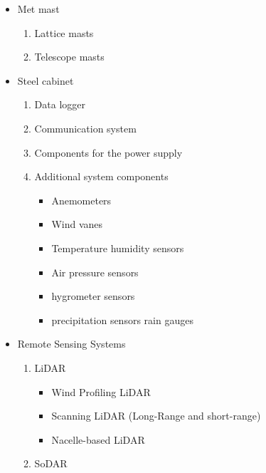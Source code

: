 \begin{itemize}
    \item Met mast
        \begin{enumerate}
            \vspace{-0.2cm}\item Lattice masts
            \vspace{-0.2cm}\item Telescope masts
        \end{enumerate}
    \item Steel cabinet
        \begin{enumerate}
            \vspace{-0.2cm}\item Data logger
            \vspace{-0.2cm}\item Communication system
           \vspace{-0.2cm} \item Components for the power supply
            \vspace{-0.2cm}\item Additional system components
                \begin{itemize}
                        \vspace{-0.2cm}\item Anemometers
                       \vspace{-0.2cm} \item Wind vanes
                       \vspace{-0.2cm} \item Temperature humidity sensors
                        \vspace{-0.2cm}\item Air pressure sensors
                         \vspace{-0.2cm}\item hygrometer sensors
                        \vspace{-0.2cm}\item precipitation sensors rain gauges   
                \end{itemize}
        \end{enumerate}
    \item Remote Sensing Systems
        \begin{enumerate}
            \item LiDAR
            \begin{itemize}
                    \item Wind Profiling LiDAR
                    \item Scanning LiDAR (Long-Range and short-range)
                    \item Nacelle-based LiDAR
                \end{itemize}
            \item SoDAR
        \end{enumerate}
\end{itemize}



